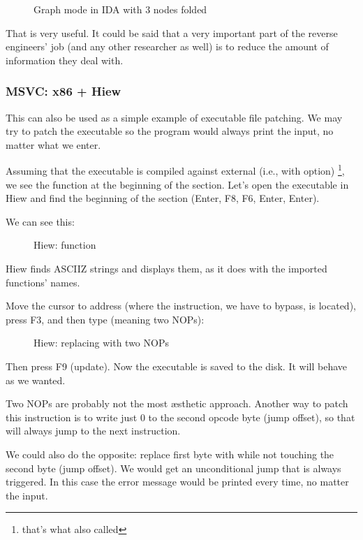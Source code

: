 \begin{figure}[H]
\centering
{}
\caption{Graph mode in IDA with 3 nodes folded}
\label{fig:ex3_IDA_2}
\end{figure}

That is very useful.
It could be said that a very important part of the reverse engineers' job (and any other researcher as well) is to reduce the amount of information they deal with.



\clearpage
\subsubsection{MSVC: x86 + Hiew}

This can also be used as a simple example of executable file patching.
We may try to patch the executable so the program would always print the input, no matter what we enter.

Assuming that the executable is compiled against external  (i.e., with  option)
\footnote{that's what also called }, 
we see the \main function at the beginning of the  section.
Let's open the executable in Hiew and find the beginning of the  section (Enter, F8, F6, Enter, Enter).

We can see this:

\begin{figure}[H]
\centering
{}
\caption{Hiew: \main function}
\label{fig:scanf_ex3_hiew_1}
\end{figure}

Hiew finds \ac{ASCIIZ} strings and displays them, as it does with the imported functions' names.

\clearpage
Move the cursor to address  (where the  instruction, we have to bypass, is located), press F3, and then type  (meaning two \ac{NOP}s):

\begin{figure}[H]
\centering
{}
\caption{Hiew: replacing  with two \ac{NOP}s}
\label{fig:scanf_ex3_hiew_2}
\end{figure}

Then press F9 (update). Now the executable is saved to the disk. It will behave as we wanted.

Two \ac{NOP}s are probably not the most \ae{}sthetic approach.
Another way to patch this instruction is to write just 0 to the second opcode byte (\gls{jump offset}), 
so that  will always jump to the next instruction.

We could also do the opposite: replace first byte with  while not touching the second byte (\gls{jump offset}).
We would get an unconditional jump that is always triggered.
In this case the error message would be printed every time, no matter the input.

